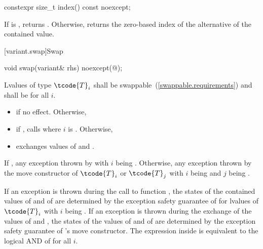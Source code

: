 %
\begin{itemdecl}
constexpr size_t index() const noexcept;
\end{itemdecl}

\begin{itemdescr}
\pnum
\effects
If  is , returns .
Otherwise, returns the zero-based index of the alternative of the contained value.
\end{itemdescr}

[variant.swap]{Swap}

%
\begin{itemdecl}
void swap(variant& rhs) noexcept(@\seebelow@);
\end{itemdecl}

\begin{itemdescr}
\pnum
\requires Lvalues of type $\tcode{T}_i$ shall be swappable~(\ref{swappable.requirements}) and
 shall be  for all $i$.

\pnum
\effects
\begin{itemize}
\item
if  no effect. Otherwise,
\item
if , calls  where $i$ is . Otherwise,
\item
exchanges values of  and .
\end{itemize}

\pnum
\throws
If ,
any exception thrown by 
with $i$ being .
Otherwise, any exception thrown by the move constructor
of $\tcode{T}_i$ or $\tcode{T}_j$
with $i$ being  and $j$ being .

\pnum
\remarks
If an exception is thrown during the call to function ,
the states of the contained values of  and of  are
determined by the exception safety guarantee of  for lvalues of
$\tcode{T}_i$ with $i$ being .
If an exception is thrown during the exchange of the values of 
and , the states of the values of  and of 
are determined by the exception safety guarantee of 's move constructor.
The expression inside  is equivalent to the logical AND of
 for all $i$.
\end{itemdescr}

